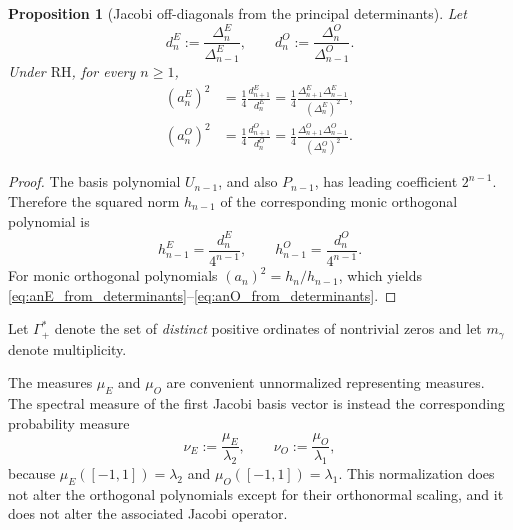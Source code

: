 \documentclass[11pt]{amsart}
\numberwithin{equation}{section}
\theoremstyle{plain}
\newtheorem{proposition}[theorem]{Proposition}
\theoremstyle{definition}
\theoremstyle{remark}
\newcommand{\RH}{\mathrm{RH}}
\begin{document}
\begin{proposition}[Jacobi off-diagonals from the principal determinants]
\label{prop:jacobi_from_determinants}
Let
\begin{equation}
d_n^E:=\frac{\Delta_n^E}{\Delta_{n-1}^E},
\qquad
d_n^O:=\frac{\Delta_n^O}{\Delta_{n-1}^O}.
\label{eq:pivot_short_notation}
\end{equation}
Under $\RH$, for every $n\ge1$,
\begin{align}
(a_n^E)^2
&=\frac14\frac{d_{n+1}^E}{d_n^E}
=\frac14\frac{\Delta_{n+1}^E\Delta_{n-1}^E}{(\Delta_n^E)^2},
\label{eq:anE_from_determinants}\\
(a_n^O)^2
&=\frac14\frac{d_{n+1}^O}{d_n^O}
=\frac14\frac{\Delta_{n+1}^O\Delta_{n-1}^O}{(\Delta_n^O)^2}.
\label{eq:anO_from_determinants}
\end{align}
\end{proposition}

\begin{proof}
The basis polynomial $U_{n-1}$, and also $P_{n-1}$, has leading coefficient $2^{n-1}$.  Therefore the squared norm $h_{n-1}$ of the corresponding monic orthogonal polynomial is
\begin{equation}
h_{n-1}^E=\frac{d_n^E}{4^{n-1}},
\qquad
h_{n-1}^O=\frac{d_n^O}{4^{n-1}}.
\label{eq:monic_norm_from_pivot}
\end{equation}
For monic orthogonal polynomials $(a_n)^2=h_n/h_{n-1}$, which yields \eqref{eq:anE_from_determinants}--\eqref{eq:anO_from_determinants}.
\end{proof}

Let $\Gamma_+^*$ denote the set of \emph{distinct} positive ordinates of nontrivial zeros and let $m_\gamma$ denote multiplicity.

The measures $\mu_E$ and $\mu_O$ are convenient unnormalized representing measures. The spectral measure of the first Jacobi basis vector is instead the corresponding probability measure
\begin{equation}
\nu_E:=\frac{\mu_E}{\lambda_2},
\qquad
\nu_O:=\frac{\mu_O}{\lambda_1},
\label{eq:normalized_spectral_measures}
\end{equation}
because $\mu_E([-1,1])=\lambda_2$ and $\mu_O([-1,1])=\lambda_1$. This normalization does not alter the orthogonal polynomials except for their orthonormal scaling, and it does not alter the associated Jacobi operator.
\end{document}
